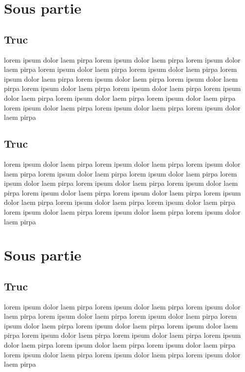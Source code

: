 \documentclass[11pt,fleqn]{book}
\begin{document}
\section{Sous partie}
\subsection{Truc}
lorem  ipsum  dolor  laem  pirpa  lorem  ipsum  dolor  laem  pirpa  lorem  ipsum  dolor  laem  pirpa  lorem  ipsum  dolor  laem  pirpa  lorem  ipsum  dolor  laem  pirpa  lorem  ipsum  dolor  laem  pirpa  lorem  ipsum  dolor  laem  pirpa  lorem  ipsum  dolor  laem  pirpa  lorem  ipsum  dolor  laem  pirpa  lorem  ipsum  dolor  laem  pirpa  lorem  ipsum  dolor  laem  pirpa  lorem  ipsum  dolor  laem  pirpa  lorem  ipsum  dolor  laem  pirpa  lorem  ipsum  dolor  laem  pirpa  lorem  ipsum  dolor  laem  pirpa  lorem  ipsum  dolor  laem  pirpa 
~\\
\subsection{Truc}
lorem  ipsum  dolor  laem  pirpa  lorem  ipsum  dolor  laem  pirpa  lorem  ipsum  dolor  laem  pirpa  lorem  ipsum  dolor  laem  pirpa  lorem  ipsum  dolor  laem  pirpa  lorem  ipsum  dolor  laem  pirpa  lorem  ipsum  dolor  laem  pirpa  lorem  ipsum  dolor  laem  pirpa  lorem  ipsum  dolor  laem  pirpa  lorem  ipsum  dolor  laem  pirpa  lorem  ipsum  dolor  laem  pirpa  lorem  ipsum  dolor  laem  pirpa  lorem  ipsum  dolor  laem  pirpa  lorem  ipsum  dolor  laem  pirpa  lorem  ipsum  dolor  laem  pirpa  lorem  ipsum  dolor  laem  pirpa 
~\\
\section{Sous partie}
\subsection{Truc}
lorem  ipsum  dolor  laem  pirpa  lorem  ipsum  dolor  laem  pirpa  lorem  ipsum  dolor  laem  pirpa  lorem  ipsum  dolor  laem  pirpa  lorem  ipsum  dolor  laem  pirpa  lorem  ipsum  dolor  laem  pirpa  lorem  ipsum  dolor  laem  pirpa  lorem  ipsum  dolor  laem  pirpa  lorem  ipsum  dolor  laem  pirpa  lorem  ipsum  dolor  laem  pirpa  lorem  ipsum  dolor  laem  pirpa  lorem  ipsum  dolor  laem  pirpa  lorem  ipsum  dolor  laem  pirpa  lorem  ipsum  dolor  laem  pirpa  lorem  ipsum  dolor  laem  pirpa  lorem  ipsum  dolor  laem  pirpa 
~\\
\end{document}
